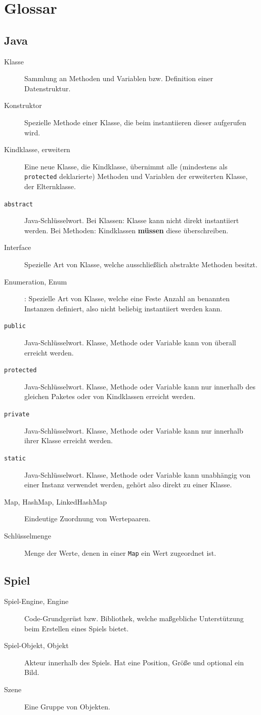 

\chapter*{Glossar}

\section{Java}

\begin{description}
	\item[Klasse] Sammlung an Methoden und Variablen bzw. Definition einer Datenstruktur.
	\item[Konstruktor] Spezielle Methode einer Klasse, die beim instantiieren dieser aufgerufen wird.
	\item[Kindklasse, erweitern] Eine neue Klasse, die Kindklasse, übernimmt alle (mindestens
		als \texttt{protected} deklarierte) Methoden und Variablen der erweiterten Klasse,
		der Elternklasse.
	\item[\texttt{abstract}] Java-Schlüsselwort. Bei Klassen: Klasse kann nicht direkt
		instantiiert werden. Bei Methoden: Kindklassen \textbf{müssen} diese überschreiben.
	\item[Interface] Spezielle Art von Klasse, welche ausschließlich abstrakte Methoden besitzt.
	\item[Enumeration, Enum]: Spezielle Art von Klasse, welche eine Feste Anzahl an benannten
		Instanzen definiert, also nicht beliebig instantiiert werden kann.
	\item[\texttt{public}] Java-Schlüsselwort. Klasse, Methode oder Variable kann von
		überall erreicht werden.
	\item[\texttt{protected}] Java-Schlüsselwort. Klasse, Methode oder Variable kann
		nur innerhalb des gleichen Paketes oder von Kindklassen erreicht werden.
	\item[\texttt{private}] Java-Schlüsselwort. Klasse, Methode oder Variable kann
		nur innerhalb ihrer Klasse erreicht werden.
	\item[\texttt{static}] Java-Schlüsselwort. Klasse, Methode oder Variable kann
		unabhängig von einer Instanz verwendet werden, gehört also direkt zu einer
		Klasse.
	\item[Map, HashMap, LinkedHashMap] Eindeutige Zuordnung von Wertepaaren.
	\item[Schlüsselmenge] Menge der Werte, denen in einer \texttt{Map} ein Wert zugeordnet ist.
\end{description}


\section{Spiel}

\begin{description}
	\item[Spiel-Engine, Engine] Code-Grundgerüst bzw. Bibliothek, welche maßgebliche
		Unterstützung beim Erstellen eines Spiels bietet.
	\item[Spiel-Objekt, Objekt] Akteur innerhalb des Spiels. Hat eine Position, Größe und optional ein Bild.
	\item[Szene] Eine Gruppe von Objekten.
\end{description}